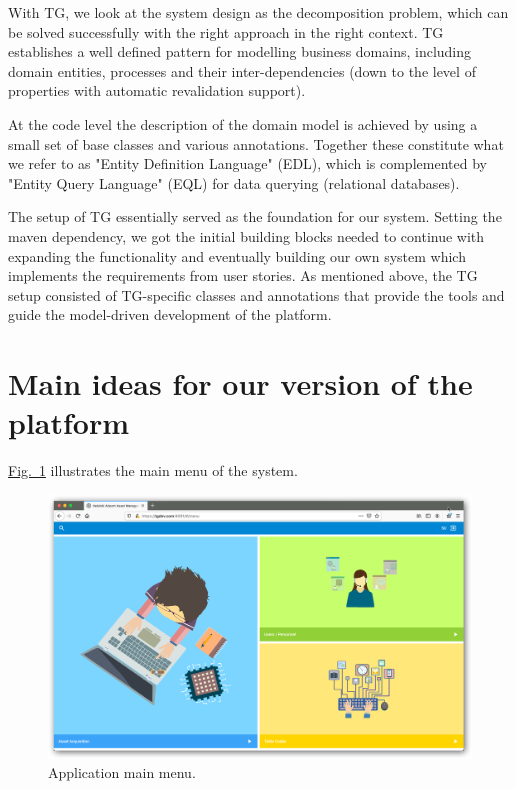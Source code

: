 \documentclass[a4paper, 12pt, final]{hitec}
\begin{document}
  With TG, we look at the system design as the decomposition problem,
  which can be solved successfully with the right approach in the right context.
  TG establishes a well defined pattern for modelling business domains,
  including domain entities, processes and their inter-dependencies (down to the
  level of properties with automatic revalidation support).
  
  At the code level the
  description of the domain model is achieved by using a small set of base classes
  and various annotations. Together these constitute what we refer to as "Entity
  Definition Language" (EDL), which is complemented by "Entity Query Language"
  (EQL) for data querying (relational databases).

  The setup of TG essentially served as the foundation for our system.
  Setting the maven dependency, we got the initial building blocks needed
  to continue with expanding the functionality and eventually building our own
  system which implements the requirements from user stories. As mentioned above,
  the TG setup consisted of TG-specific classes and annotations that provide the
  tools and guide the model-driven development of the platform.
  \clearpage

  \section{Main ideas for our version of the platform}\label{sec:02}
  \hyperref[sec:01_01:fig:01]{Fig.~\ref*{sec:01_01:fig:01}} illustrates the main menu of the system.
	\begin{figure}[!htbp]
	\centering
	\includegraphics[width=0.95\linewidth]{images/01-main-menu.png}
	\caption{Application main menu.}\label{sec:01_01:fig:01}
  \end{figure}
\end{document}
